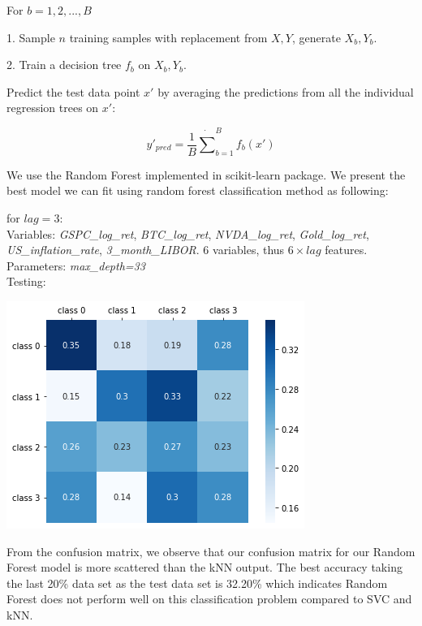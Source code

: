 \documentclass[9pt,twocolumn,twoside]{ilcss}
\begin{document}
\hspace{2mm} For $b=1,2,...,B$

\hspace{4mm}1. Sample $n$ training samples with replacement from $X,Y$, generate $X_b, Y_b$.

\hspace{4mm}2. Train a decision tree $f_b$ on $X_b, Y_b$.

\hspace{2mm} Predict the test data point $x'$ by averaging the predictions from all the individual regression trees on $x'$:

\[
y'_{pred}=\frac{1}{B} \dot \sum_{b=1}^B f_b(x')
\]

We use the Random Forest implemented in scikit-learn package. We present the best model we can fit using random forest classification method as following:

\noindent  for $lag = 3$:
\smallskip\\
Variables: \textit{GSPC\_log\_ret}, \textit{BTC\_log\_ret}, \textit{NVDA\_log\_ret}, \textit{Gold\_log\_ret}, \textit{US\_inflation\_rate}, \textit{3\_month\_LIBOR}. 6 variables, thus $6\times lag$ features.
Parameters: \textit{max\_depth=33}
\smallskip\\
Testing:

\begin{center}
\includegraphics[scale=0.35]{rf_test.png}
\end{center}

From the confusion matrix, we observe that our confusion matrix for our Random Forest model is more scattered than the kNN output. The best accuracy taking the last 20\% data set as the test data set is 32.20\% which indicates Random Forest does not perform well on this classification problem compared to SVC and kNN.
\end{document}
